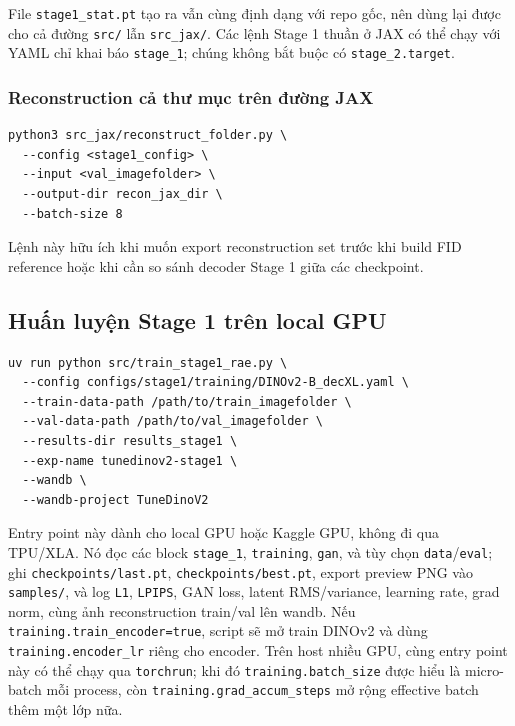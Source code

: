 File \texttt{stage1\_stat.pt} tạo ra vẫn cùng định dạng với repo gốc, nên dùng
lại được cho cả đường \texttt{src/} lẫn \texttt{src\_jax/}.
Các lệnh Stage 1 thuần ở JAX có thể chạy với YAML chỉ khai báo
\texttt{stage\_1}; chúng không bắt buộc có \texttt{stage\_2.target}.

\subsubsection{Reconstruction cả thư mục trên đường JAX}

\begin{lstlisting}[style=rae]
python3 src_jax/reconstruct_folder.py \
  --config <stage1_config> \
  --input <val_imagefolder> \
  --output-dir recon_jax_dir \
  --batch-size 8
\end{lstlisting}

Lệnh này hữu ích khi muốn export reconstruction set trước khi build FID reference
hoặc khi cần so sánh decoder Stage 1 giữa các checkpoint.

\subsection{Huấn luyện Stage 1 trên local GPU}

\begin{lstlisting}[style=rae]
uv run python src/train_stage1_rae.py \
  --config configs/stage1/training/DINOv2-B_decXL.yaml \
  --train-data-path /path/to/train_imagefolder \
  --val-data-path /path/to/val_imagefolder \
  --results-dir results_stage1 \
  --exp-name tunedinov2-stage1 \
  --wandb \
  --wandb-project TuneDinoV2
\end{lstlisting}

Entry point này dành cho local GPU hoặc Kaggle GPU, không đi qua TPU/XLA. Nó
đọc các block \texttt{stage\_1}, \texttt{training}, \texttt{gan}, và tùy chọn
\texttt{data}/\texttt{eval}; ghi \texttt{checkpoints/last.pt},
\texttt{checkpoints/best.pt}, export preview PNG vào \texttt{samples/}, và log
\texttt{L1}, \texttt{LPIPS}, GAN loss, latent RMS/variance, learning rate, grad
norm, cùng ảnh reconstruction train/val lên wandb. Nếu
\texttt{training.train\_encoder=true}, script sẽ mở train DINOv2 và dùng
\texttt{training.encoder\_lr} riêng cho encoder. Trên host nhiều GPU, cùng
entry point này có thể chạy qua \texttt{torchrun}; khi đó
\texttt{training.batch\_size} được hiểu là micro-batch mỗi process, còn
\texttt{training.grad\_accum\_steps} mở rộng effective batch thêm một lớp nữa.

